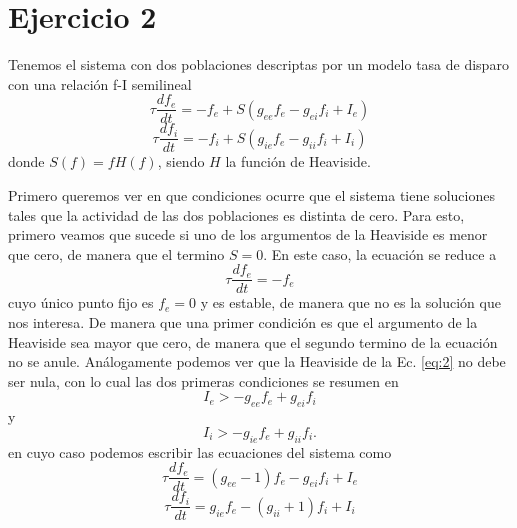 \section*{Ejercicio 2}
\graphicspath{{Figuras/ej_02/}}

Tenemos el sistema con dos poblaciones descriptas por un modelo tasa de disparo con una relación f-I semilineal
\begin{equation}
    \tau \frac{df_e}{dt} = -f_e + S\left( g_{ee} f_{e} -g_{ei} f_i + I_e \right)
\end{equation}
\begin{equation}
    \tau \frac{df_i}{dt} = -f_i + S\left( g_{ie} f_{e} -g_{ii} f_i + I_i \right)
    \label{eq:2}
\end{equation}
donde $S(f) = f H(f)$, siendo $H$ la función de Heaviside.

Primero queremos ver en que condiciones ocurre que el sistema tiene soluciones  tales que la actividad de las dos poblaciones es distinta de cero. Para esto, primero veamos que sucede si uno de los argumentos de la Heaviside es menor que cero, de manera que el termino $S = 0$. En este caso, la ecuación se reduce a
\begin{equation}
    \tau \frac{df_e}{dt} = -f_e 
\end{equation}
cuyo único punto fijo es $f_e=0$ y es estable, de manera que no es la solución que nos interesa. De manera que una primer condición es que el argumento de la Heaviside sea mayor que cero, de manera que el segundo termino de la ecuación no se anule. Análogamente podemos ver que la Heaviside de la Ec. \ref{eq:2} no debe ser nula, con lo cual las dos primeras condiciones se resumen en
\begin{equation}
    I_e > - g_{ee} f_{e} + g_{ei} f_i
    \label{02:Condicion_1}
\end{equation}
y
\begin{equation}
    I_i > - g_{ie} f_{e} + g_{ii} f_i.
    \label{02:Condicion_2}
\end{equation}
en cuyo caso podemos escribir las ecuaciones del sistema como
\begin{equation}
    \tau \frac{df_e}{dt} = \left( g_{ee} - 1 \right) f_{e} - g_{ei} f_i + I_e
\end{equation}
\begin{equation}
    \tau \frac{df_i}{dt} = g_{ie} f_{e} - \left( g_{ii} + 1 \right) f_i + I_i
    \label{eq:20}
\end{equation}

